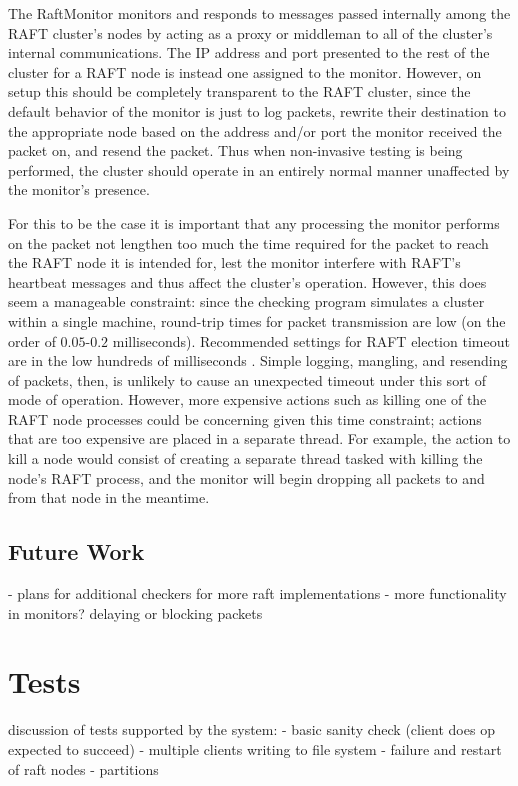 \documentclass[UTF8]{article}
\begin{document}
The RaftMonitor monitors and responds to messages passed internally among the RAFT cluster's nodes by acting as a proxy or middleman to all of the cluster's internal communications. The IP address and port presented to the rest of the cluster for a RAFT node is instead one assigned to the monitor. However, on setup this should be completely transparent to the RAFT cluster, since the default behavior of the monitor is just to log packets, rewrite their destination to the appropriate node based on the address and/or port the monitor received the packet on, and resend the packet. Thus when non-invasive testing is being performed, the cluster should operate in an entirely normal manner unaffected by the monitor's presence.

For this to be the case it is important that any processing the monitor performs on the packet not lengthen too much the time required for the packet to reach the RAFT node it is intended for, lest the monitor interfere with RAFT's heartbeat messages and thus affect the cluster's operation. However, this does seem a manageable constraint: since the checking program simulates a cluster within a single machine, round-trip times for packet transmission are low (on the order of $0.05$-$0.2$ milliseconds). Recommended settings for RAFT election timeout are in the low hundreds of milliseconds \cite{raftPaper}. Simple logging, mangling, and resending of packets, then, is unlikely to cause an unexpected timeout under this sort of mode of operation. However, more expensive actions such as killing one of the RAFT node processes could be concerning given this time constraint; actions that are too expensive are placed in a separate thread. For example, the action to kill a node would consist of creating a separate thread tasked with killing the node's RAFT process, and the monitor will begin dropping all packets to and from that node in the meantime.

\subsection{Future Work}

- plans for additional checkers for more raft implementations
- more functionality in monitors? delaying or blocking packets

\section{Tests}

discussion of tests supported by the system:
- basic sanity check (client does op expected to succeed)
- multiple clients writing to file system
- failure and restart of raft nodes
- partitions
\end{document}
